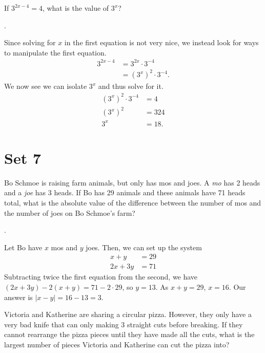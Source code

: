 \documentclass[11pt]{article}
\begin{document}
\begin{problem}If $3^{2x-4} = 4$, what is the value of $3^{x}$?
\end{problem}
\begin{answer}
.
\end{answer}
\begin{solution}
Since solving for $x$ in the first equation is not very nice, we instead look for ways to manipulate the first equation.
\begin{align*}
3^{2x-4} &= 3^{2x} \cdot 3^{-4} \\
&= (3^x)^2 \cdot 3^{-4}.
\end{align*}
We now see we can isolate  $3^{x}$ and thus solve for it.
\begin{align*}
(3^x)^2 \cdot 3^{-4} &= 4 \\
(3^x)^2 &= 324 \\
3^x &= \boxed{18}.
\end{align*}
\end{solution}

\eject

\pdfpageheight=11in

\section*{Set 7}

\begin{problem}  Bo Schmoe is raising farm animals, but only has mos and joes. A \emph{mo} has 2 heads and a \emph{joe} has 3 heads. If Bo has 29 animals and these animals have 71 heads total, what is the absolute value of the difference between the number of mos and the number of joes on Bo Schmoe's farm?
\end{problem}

\begin{answer} . \end{answer}
\begin{solution}
Let Bo have $x$ mos and $y$ joes. Then, we can set up the system
\begin{align*}
x + y &= 29 \\
2x + 3y &= 71
\end{align*}
Subtracting twice the first equation from the second, we have $(2x + 3y) - 2(x + y) = 71 - 2 \cdot 29$, so $y = 13$. As $x + y = 29$, $x = 16$. Our answer is $\left| x - y \right| = 16 - 13 = \boxed{3}$.
\end{solution}

\begin{problem} Victoria and Katherine are sharing a circular pizza. However, they only have a very bad knife that can only making 3 straight cuts before breaking. If they cannot rearrange the pizza pieces until they have made all the cuts, what is the largest number of pieces Victoria and Katherine can cut the pizza into?
\end{problem}
\end{document}
